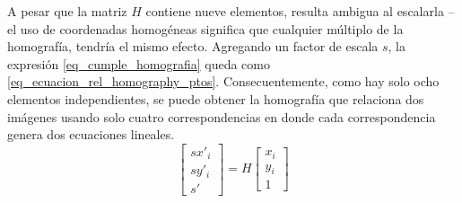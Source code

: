 \documentclass[a4paper,11pt,spanish]{article}
\begin{document}
A pesar que la matriz $H$ contiene nueve elementos, resulta ambigua al escalarla -- el uso de coordenadas homogéneas significa que cualquier múltiplo de la homografía, tendría el mismo efecto. Agregando un factor de escala $s$, la expresión \eqref{eq_cumple_homografia} queda como \eqref{eq_ecuacion_rel_homography_ptos}. Consecuentemente, como hay solo ocho elementos independientes, se puede obtener la homografía que relaciona dos imágenes usando solo cuatro correspondencias en donde cada correspondencia genera dos ecuaciones lineales. 
\begin{equation}
  \begin{bmatrix} sx'_i \\
  sy'_i\\
  s'
  \end{bmatrix}=H
  \begin{bmatrix}
  x_i\\
  y_i\\
  1
  \end{bmatrix}
  \label{eq_ecuacion_rel_homography_ptos}
\end{equation}
% 




% 
\end{document}
